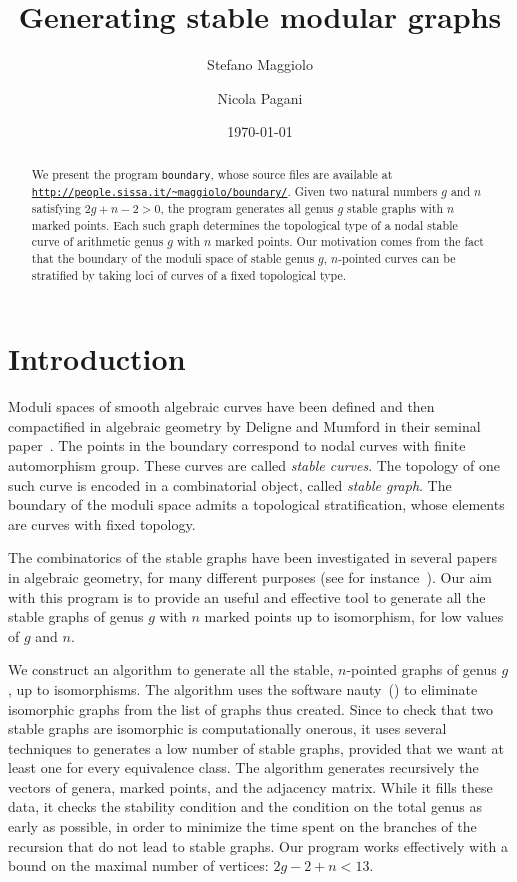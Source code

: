\documentclass{amsart}
\title{Generating stable modular graphs}
\author{Stefano Maggiolo}
\author{Nicola Pagani}
\date{\today}
\theoremstyle{plain}
\theoremstyle{definition}
\begin{document}
\begin{abstract}
  We present the program \texttt{boundary}, whose source files are
  available at \href{http://people.sissa.it/~maggiolo/boundary/}
  {\texttt{http://people.sissa.it/\~{}maggiolo/boundary/}}. Given two
  natural numbers $g$ and $n$ satisfying $2g+n-2>0$, the program
  generates all genus $g$ stable graphs with $n$ marked points. Each
  such graph determines the topological type of a nodal stable curve
  of arithmetic genus $g$ with $n$ marked points. Our motivation comes
  from the fact that the boundary of the moduli space of stable genus
  $g$, $n$-pointed curves can be stratified by taking loci of curves
  of a fixed topological type.
\end{abstract}

\maketitle
\setcounter{tocdepth}{1}
\tableofcontents


\section{Introduction}
Moduli spaces of smooth algebraic curves have been defined and then
compactified in algebraic geometry by Deligne and Mumford in their
seminal paper~\cite{delignemumford}. The points in the boundary
correspond to nodal curves with finite automorphism group. These
curves are called \emph{stable curves}. The topology of one such curve
is encoded in a combinatorial object, called \emph{stable graph}. The
boundary of the moduli space admits a topological stratification,
whose elements are curves with fixed topology.

The combinatorics of the stable graphs have been investigated in
several papers in algebraic geometry, for many different purposes (see
for instance~\cite{modularoperads,opstall,opstall2,stephanie2}). Our
aim with this program is to provide an useful and effective tool to
generate all the stable graphs of genus $g$ with $n$ marked points up
to isomorphism, for low values of $g$ and $n$.

We construct an algorithm to generate all the stable, $n$-pointed
graphs of genus $g$, up to isomorphisms. The algorithm uses the
software nauty~(\cite{nauty}) to eliminate isomorphic graphs from the
list of graphs thus created. Since to check that two stable graphs are
isomorphic is computationally onerous, it uses several techniques to
generates a low number of stable graphs, provided that we want at
least one for every equivalence class. The algorithm generates
recursively the vectors of genera, marked points, and the adjacency
matrix. While it fills these data, it checks the stability condition
and the condition on the total genus as early as possible, in order to
minimize the time spent on the branches of the recursion that do not
lead to stable graphs. Our program works effectively with a bound on
the maximal number of vertices: $2g-2+n<13$. %
\end{document}
